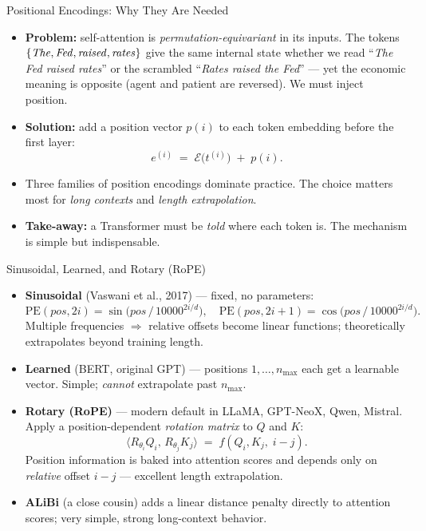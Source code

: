 \begin{frame}{Positional Encodings: Why They Are Needed}
\begin{itemize}
\item \textbf{Problem:} self-attention is \emph{permutation-equivariant} in its inputs. The tokens $\{\text{\emph{The}}, \text{\emph{Fed}}, \text{\emph{raised}}, \text{\emph{rates}}\}$ give the same internal state whether we read ``\emph{The Fed raised rates}'' or the scrambled ``\emph{Rates raised the Fed}'' --- yet the economic meaning is opposite (agent and patient are reversed). We must inject position.

\medskip
\item \textbf{Solution:} add a position vector $p(i)$ to each token embedding before the first layer:
\[
   e^{(i)} \;=\; \mathcal{E}\bigl(t^{(i)}\bigr) \;+\; p(i).
\]

\medskip
\item Three families of position encodings dominate practice. The choice matters most for \emph{long contexts} and \emph{length extrapolation}.

\medskip
\item \textbf{Take-away:} a Transformer must be \emph{told} where each token is. The mechanism is simple but indispensable.
\end{itemize}
\end{frame}

\begin{frame}{Sinusoidal, Learned, and Rotary (RoPE)}
\begin{itemize}
\item \textbf{Sinusoidal} (Vaswani et al., 2017) --- fixed, no parameters:
\[
   \mathrm{PE}(pos, 2i) = \sin\!\bigl(pos\,/\,10000^{2i/d}\bigr), \quad
   \mathrm{PE}(pos, 2i{+}1) = \cos\!\bigl(pos\,/\,10000^{2i/d}\bigr).
\]
Multiple frequencies $\Rightarrow$ relative offsets become linear functions; theoretically extrapolates beyond training length.

\medskip
\item \textbf{Learned} (BERT, original GPT) --- positions $1, \ldots, n_{\max}$ each get a learnable vector. Simple; \emph{cannot} extrapolate past $n_{\max}$.

\medskip
\item \textbf{Rotary (RoPE)} --- modern default in LLaMA, GPT-NeoX, Qwen, Mistral. Apply a position-dependent \emph{rotation matrix} to $Q$ and $K$:
\[
   \langle R_{\theta_{i}} Q_i,\, R_{\theta_{j}} K_j\rangle \;=\; f(Q_i, K_j,\; i - j).
\]
Position information is baked into attention scores and depends only on \emph{relative} offset $i{-}j$ --- excellent length extrapolation.

\medskip
\item \textbf{ALiBi} (a close cousin) adds a linear distance penalty directly to attention scores; very simple, strong long-context behavior.
\end{itemize}
\end{frame}

